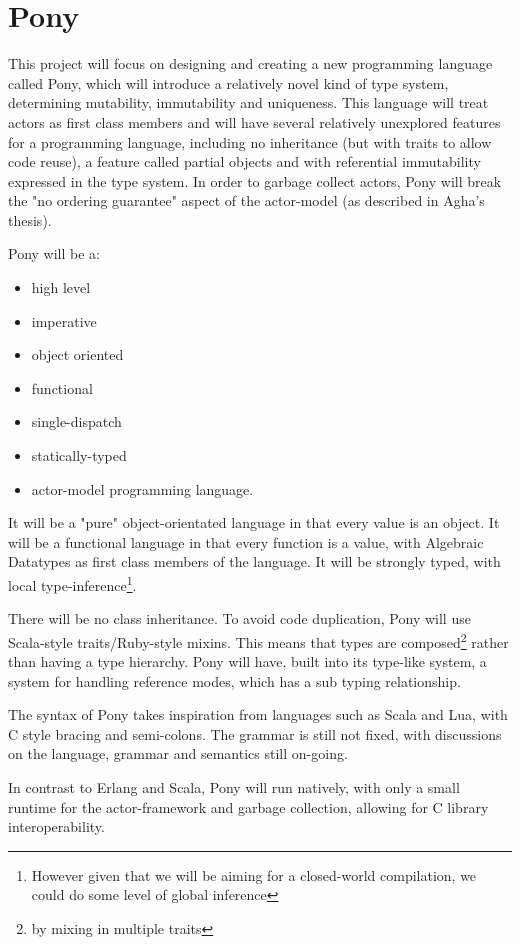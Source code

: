 \documentclass[pdftex,11pt,a4paper]{report}
\begin{document}
\newpage
\chapter{Pony}
\label{chapter:pony}

This project will focus on designing and creating a new programming language called Pony, which will introduce a relatively novel kind of type system, determining mutability, immutability and uniqueness.
This language will treat actors as first class members and will have several relatively unexplored features for a programming language, including no inheritance (but with traits to allow code reuse), a feature called partial objects and with referential immutability expressed in the type system.
In order to garbage collect actors, Pony will break the "no ordering guarantee" aspect of the actor-model (as described in Agha's thesis\cite{agha1985}).

Pony will be a:
\begin{itemize}[noitemsep]
\item high level
\item imperative
\item object oriented
\item functional
\item single-dispatch
\item statically-typed
\item actor-model programming language.
\end{itemize}
It will be a "pure" object-orientated language in that every value is an object.
It will be a functional language in that every function is a value, with Algebraic Datatypes as first class members of the language.
It will be strongly typed, with local type-inference\footnote{However given that we will be aiming for a closed-world compilation, we could do some level of global inference}.

There will be no class inheritance.
To avoid code duplication, Pony will use Scala-style traits/Ruby-style mixins.
This means that types are composed\footnote{by mixing in multiple traits} rather than having a type hierarchy.
Pony will have, built into its type-like system, a system for handling reference modes, which has a sub typing relationship.

The syntax of Pony takes inspiration from languages such as Scala and Lua, with C style bracing and semi-colons.
The grammar is still not fixed, with discussions on the language, grammar and semantics still on-going.

In contrast to Erlang and Scala, Pony will run natively, with only a small runtime for the actor-framework and garbage collection, allowing for C library interoperability.
\end{document}
